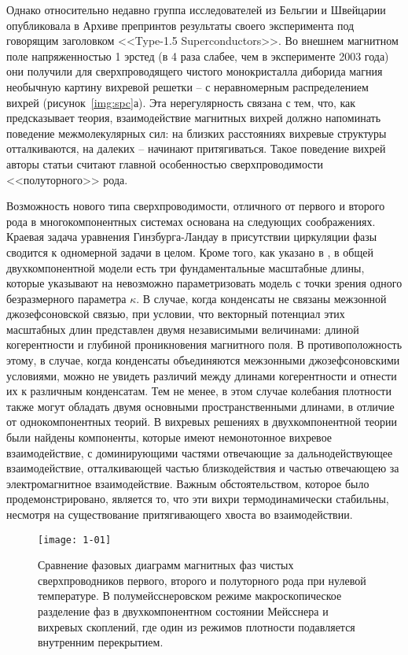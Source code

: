 Однако относительно недавно группа исследователей из Бельгии и Швейцарии 
опубликовала в Архиве препринтов результаты своего эксперимента под говорящим 
заголовком <<Type-1.5 Superconductors>>. Во внешнем магнитном поле 
напряженностью 1 эрстед (в 4 раза слабее, чем в эксперименте 2003 года) они 
получили для сверхпроводящего чистого монокристалла диборида магния необычную 
картину вихревой решетки -- с неравномерным распределением вихрей 
(рисунок~\ref{img:spc}а). Эта нерегулярность связана с тем, что, как 
предсказывает теория, взаимодействие магнитных вихрей должно напоминать 
поведение межмолекулярных сил: на близких расстояниях вихревые структуры 
отталкиваются, на далеких -- начинают притягиваться. Такое поведение вихрей 
авторы статьи считают главной особенностью сверхпроводимости <<полуторного>> 
рода. \cite{bib:superconductors}

Возможность нового типа сверхпроводимости, отличного от первого и второго рода 
в многокомпонентных системах \cite{bib:1,bib:2} основана на следующих 
соображениях. Краевая задача уравнения Гинзбурга-Ландау в присутствии 
циркуляции фазы сводится к одномерной задачи в целом. Кроме того, как указано в 
\cite{bib:1,bib:2}, в общей двухкомпонентной модели есть три фундаментальные 
масштабные длины, которые указывают на невозможно параметризовать модель с 
точки зрения одного безразмерного параметра \( \kappa \). В случае, когда 
конденсаты не связаны межзонной джозефсоновской связью, при условии, что 
векторный потенциал этих масштабных длин представлен двумя независимыми 
величинами: длиной когерентности и глубиной проникновения магнитного поля. В 
противоположность этому, в случае, когда конденсаты объединяются межзонными 
джозефсоновскими условиями, можно не увидеть различий между длинами 
когерентности и отнести их к различным конденсатам. Тем не менее, в этом 
случае колебания плотности также могут обладать двумя основными 
пространственными длинами\cite{bib:2}, в отличие от однокомпонентных теорий. 
В \cite{bib:1,bib:2} вихревых решениях в двухкомпонентной теории были найдены 
компоненты, которые имеют немонотонное вихревое взаимодействие, с 
доминирующими частями отвечающие за дальнодействующее взаимодействие, 
отталкивающей частью близкодействия и частью отвечающею за электромагнитное 
взаимодействие. Важным обстоятельством, которое было продемонстрировано, 
является то, что эти вихри термодинамически стабильны, несмотря на 
существование притягивающего хвоста во взаимодействии.

\begin{figure}[h!]
    \center
    \texttt{[image: 1-01]}
    \caption{Сравнение фазовых диаграмм магнитных фаз чистых сверхпроводников
        первого, второго и полуторного рода при нулевой температуре. В 
        полумейсснеровском режиме макроскопическое разделение фаз в 
        двухкомпонентном состоянии Мейсснера и вихревых скоплений, где 
        один из режимов плотности подавляется внутренним перекрытием.}
    \label{fig:1}
\end{figure}

